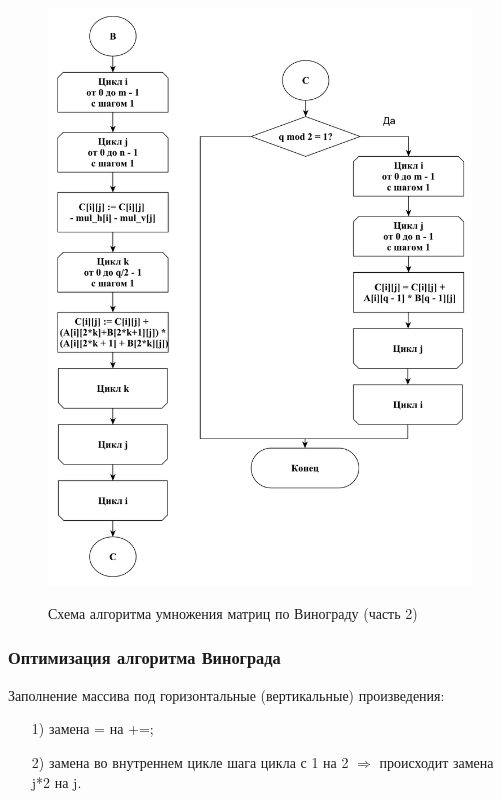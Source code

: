 \documentclass[a4paper,12pt]{article}
\begin{document}
        \begin{figure}[h!]
        	\begin{center}
        		{\includegraphics[scale = 0.5]{schema07.pdf}}
        		\caption{Схема алгоритма умножения матриц по Винограду (часть 2)}
        		\label{fig:schema_mult_v_2}
        	\end{center}
        \end{figure}
        
        \subsubsection{Оптимизация алгоритма Винограда}
        		Заполнение массива под горизонтальные (вертикальные) произведения:
	\begin{enumerate} 
	\item[1)] замена = на +=;
	\item[2)] замена во внутреннем цикле шага цикла с 1 на 2 $\Rightarrow$ происходит замена j*2 на j.
	\end{enumerate}
	
\end{document}
